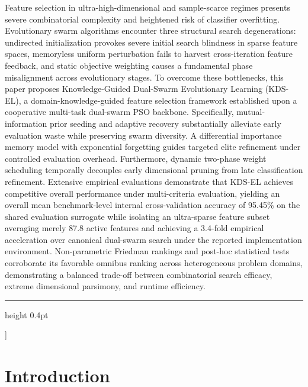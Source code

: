 \documentclass[final,5p,times,fleqn]{elsarticle}
\begin{document}
{\begin{minipage}[t]{0.68\textwidth}
{    Feature selection in ultra-high-dimensional and sample-scarce regimes presents severe combinatorial complexity and heightened risk of classifier overfitting. Evolutionary swarm algorithms encounter three structural search degenerations: undirected initialization provokes severe initial search blindness in sparse feature spaces, memoryless uniform perturbation fails to harvest cross-iteration feature feedback, and static objective weighting causes a fundamental phase misalignment across evolutionary stages. To overcome these bottlenecks, this paper proposes Knowledge-Guided Dual-Swarm Evolutionary Learning (KDS-EL), a domain-knowledge-guided feature selection framework established upon a cooperative multi-task dual-swarm PSO backbone. Specifically, mutual-information prior seeding and adaptive recovery substantially alleviate early evaluation waste while preserving swarm diversity. A differential importance memory model with exponential forgetting guides targeted elite refinement under controlled evaluation overhead. Furthermore, dynamic two-phase weight scheduling temporally decouples early dimensional pruning from late classification refinement. Extensive empirical evaluations demonstrate that KDS-EL achieves competitive overall performance under multi-criteria evaluation, yielding an overall mean benchmark-level internal cross-validation accuracy of 95.45\% on the shared evaluation surrogate while isolating an ultra-sparse feature subset averaging merely 87.8 active features and achieving a 3.4-fold empirical acceleration over canonical dual-swarm search under the reported implementation environment. Non-parametric Friedman rankings and post-hoc statistical tests corroborate its favorable omnibus ranking across heterogeneous problem domains, demonstrating a balanced trade-off between combinatorial search efficacy, extreme dimensional parsimony, and runtime efficiency.\par
    }
  \end{minipage}

  \vspace{6pt}
  \hrule height 0.4pt
  \vspace{10pt}
}]

\section{Introduction}\label{sec:introduction}
\end{document}
